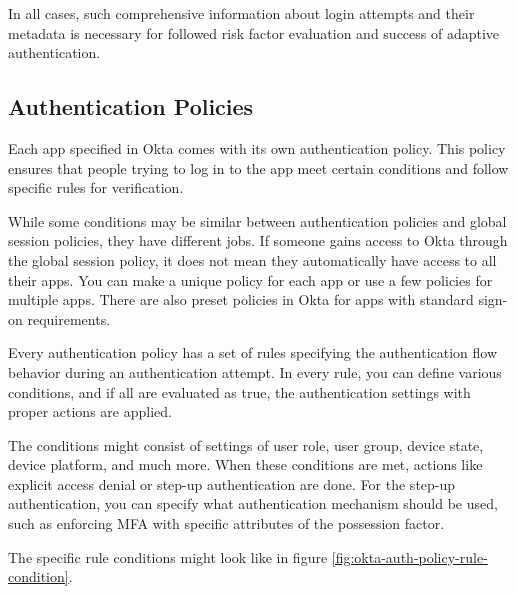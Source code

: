 In all cases, such comprehensive information about login attempts and their metadata is necessary for followed risk factor evaluation and success of adaptive authentication. 

\subsection*{Authentication Policies}
Each app specified in Okta comes with its own authentication policy.
This policy ensures that people trying to log in to the app meet certain conditions and follow specific rules for verification.

While some conditions may be similar between authentication policies and global session policies, they have different jobs. 
If someone gains access to Okta through the global session policy, it does not mean they automatically have access to all their apps.
You can make a unique policy for each app or use a few policies for multiple apps.
There are also preset policies in Okta for apps with standard sign-on requirements.

Every authentication policy has a set of rules specifying the authentication flow behavior during an authentication attempt.
In every rule, you can define various conditions, and if all are evaluated as true, the authentication settings with proper actions are applied.

The conditions might consist of settings of user role, user group, device state, device platform, and much more.
When these conditions are met, actions like explicit access denial or step-up authentication are done.
For the step-up authentication, you can specify what authentication mechanism should be used, such as enforcing MFA with specific attributes of the possession factor.

The specific rule conditions might look like in figure \ref{fig:okta-auth-policy-rule-condition}.

